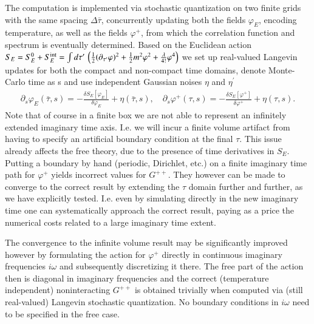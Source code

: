 \documentclass[epj]{webofc}
\begin{document}
The computation is implemented via stochastic quantization on two finite grids with the same spacing $\Delta\bar\tau$, concurrently updating both the fields $\varphi_E$, encoding temperature, as well as the fields $\varphi^+$, from which the correlation function and spectrum is eventually determined. Based on the Euclidean action $S_E=S_E^0+S_E^{\rm int}=\int d\tau^\prime \, \left( \frac{1}{2} (\partial_{\tau^\prime} \varphi)^2+ \frac{1}{2} m^2\varphi^2+\frac{\lambda}{4!}\varphi^4\right)$ we set up  real-valued Langevin updates for both the compact and non-compact time domains, denote Monte-Carlo time as s and use independent Gaussian noises $\eta$ and $\eta^\prime$
\begin{align}
\partial_s \varphi_E(\bar{\tau},s)=-\frac{\delta S_E[\varphi_E]}{\delta \varphi_E}+\eta(\bar{\tau},s), \quad \partial_s \varphi^+(\tau,s)=-\frac{\delta S_E[\varphi^+]}{\delta \varphi^+}+\eta(\tau,s). \end{align}
Note that of course in a finite box we are not able to represent an infinitely extended imaginary time axis. I.e. we will incur a finite volume artifact from having to specify an artificial boundary condition at the final $\tau$. This issue already affects the free theory, due to the  presence of time derivatives in $S_E$. Putting a boundary by hand (periodic, Dirichlet, etc.) on a finite imaginary time path for $\varphi^+$ yields incorrect values for $G^{++}$. They however can be made to converge to the correct result by extending the $\tau$ domain further and further, as we have explicitly tested. I.e. even by simulating directly in the new imaginary time one can systematically approach the correct result, paying as a price the numerical costs related to a large imaginary time extent. 

The convergence to the infinite volume result may be significantly improved however by formulating the action for $\varphi^+$  directly in continuous imaginary frequencies $i\omega$ and subsequently discretizing it there. The free part of the action then is diagonal in imaginary frequencies and the correct (temperature independent) noninteracting $G^{++}$ is obtained trivially when computed via (still real-valued) Langevin stochastic quantization. No boundary conditions in $i\omega$ need to be specified in the free case. 
\end{document}
